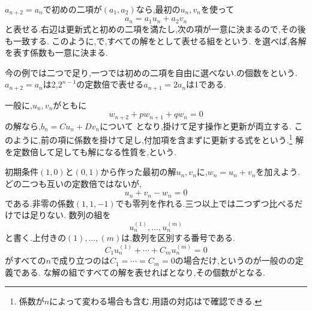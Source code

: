     $a_{n+2}=a_n$で初めの二項が$(a_1,a_2)$なら,最初の$u_n,v_n$を使って
    \[
      a_n=a_1u_n+a_2v_n
    \]
    と表せる.右辺は更新式と初めの二項を満たし,次の項が一意に決まるので,その後も一致する.
    このように,で,すべての解をとして表せる組を\textbf{}という.
    を選べば,各解を表す係数も一意に決まる.

    今の例では二つで足り,一つでは初めの二項を自由に選べない.の個数を\textbf{}という.
    $a_{n+2}=a_n$は2,$2^{n-1}$の定数倍で表せる$a_{n+1}=2a_n$は1である.

    一般に,$u_n,v_n$がともに
    \[
      w_{n+2}+pw_{n+1}+qw_n=0
    \]
    の解なら,$b_n=Cu_n+Dv_n$について
    \BookMathLayout{\[
      \begin{aligned}
        b_{n+2}+pb_{n+1}+qb_n
        &=C(u_{n+2}+pu_{n+1}+qu_n)\\
        &\quad+D(v_{n+2}+pv_{n+1}+qv_n)\\
        &=0
      \end{aligned}
    \]}{\[
      \begin{aligned}
        b_{n+2}+pb_{n+1}+qb_n\\
        {}=C(u_{n+2}+pu_{n+1}+qu_n)\\
        \quad+D(v_{n+2}+pv_{n+1}+qv_n)\\
        {}=0
      \end{aligned}
    \]}
    となり,掛けて足す操作と更新が両立する.
    このように,前の項に係数を掛けて足し,付加項を含まずに更新する式をという.\footnote{係数が$n$によって変わる場合も含む.用語の対応はで確認できる.}
    解を定数倍して足しても解になる性質を,\textbf{}という.

    初期条件$(1,0)$と$(0,1)$から作った最初の解$u_n,v_n$に,$w_n=u_n+v_n$を加えよう.
    どの二つも互いの定数倍ではないが,
    \[
      u_n+v_n-w_n=0
    \]
    である.非零の係数$(1,1,-1)$でも零列を作れる.三つ以上では二つずつ比べるだけでは足りない.
    数列の組を
    \[
      u^{(1)}_n,\ldots,u^{(m)}_n
    \]
    と書く.上付きの$(1),\ldots,(m)$は,数列を区別する番号である.
    \[
      C_1u^{(1)}_n+\cdots+C_mu^{(m)}_n=0
    \]
    がすべての$n$で成り立つのは$C_1=\cdots=C_m=0$の場合だけ,というのが一般のの定義である.
    \mbox{}な解の組ですべての解を表せればとなり,その個数がとなる.

